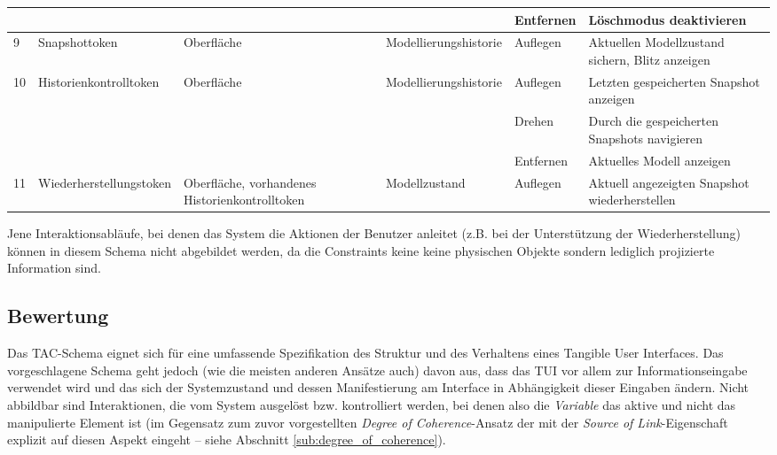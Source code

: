 \begin{longtable}{| p{} || p{} | p{2cm} || p{2cm} | p{2cm} | p{3cm} |}
		 				   &    	& 			 &  & Entfernen & Löschmodus deaktivieren \\ \hline
		9 & Snapshot\-token & Oberfläche & Modell\-ierungs\-historie & Auflegen & Aktuellen Modellzustand sichern, Blitz anzeigen \\ \hline
		\multirow{3}{*}{10} & Historien\-kontroll\-token & Oberfläche & Modell\-ierungs\-historie  & Auflegen & Letzten gespeicherten Snapshot anzeigen \\ \cline{5-6}
						   &   &			 &  & Drehen & Durch die gespeicherten Snapshots navigieren \\ \cline{5-6}
						   &   &			 &  & Entfernen & Aktuelles Modell anzeigen \\ \hline
		11 & Wieder\-herstellungs\-token & Oberfläche, vorhandenes Historien\-kontroll\-token & Modell\-zustand & Auflegen & Aktuell angezeigten Snapshot wiederherstellen \\ \hline

	\end{longtable}

Jene Interaktionsabläufe, bei denen das System die Aktionen der Benutzer anleitet (z.B. bei der Unterstützung der Wiederherstellung) können in diesem Schema nicht abgebildet werden, da die Constraints keine keine physischen Objekte sondern lediglich projizierte Information sind.

\subsection{Bewertung}

Das \gls{TAC}-Schema eignet sich für eine umfassende Spezifikation des Struktur und des Verhaltens eines Tangible User Interfaces. Das vorgeschlagene Schema geht jedoch (wie die meisten anderen Ansätze auch) davon aus, dass das \gls{TUI} vor allem zur Informationseingabe verwendet wird und das sich der Systemzustand und dessen Manifestierung am Interface in Abhängigkeit dieser Eingaben ändern. Nicht abbildbar sind Interaktionen, die vom System ausgelöst bzw. kontrolliert werden, bei denen also die \emph{Variable} das aktive und nicht das manipulierte Element ist (im Gegensatz zum zuvor vorgestellten \emph{Degree of Coherence}-Ansatz der mit der \emph{Source of Link}-Eigenschaft explizit auf diesen Aspekt eingeht -- siehe Abschnitt \ref{sub:degree_of_coherence}).

